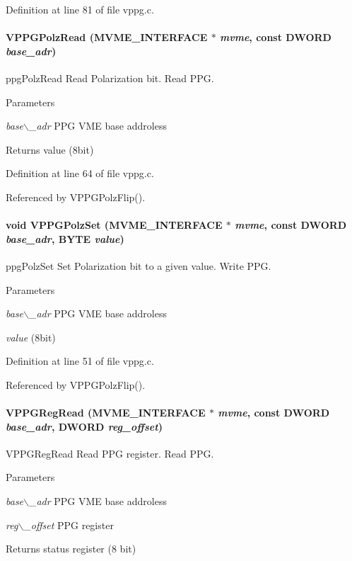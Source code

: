 Definition at line 81 of file vppg.c.
\paragraph[{VPPGPolzRead}]{ VPPGPolzRead ({\bf MVME\_\-INTERFACE} $\ast$ {\em mvme}, \/  const {\bf DWORD} {\em base\_\-adr})}\hfill\label{vppg_8c_a5250200ded85e3f2e65c941384379ed5}
ppgPolzRead Read Polarization bit.  Read PPG. 
\begin{DoxyParams}{Parameters}
\item[{\em base$\backslash$\_\-adr}]PPG VME base addroless \end{DoxyParams}
\begin{DoxyReturn}{Returns}
value (8bit) 
\end{DoxyReturn}


Definition at line 64 of file vppg.c.

Referenced by VPPGPolzFlip().
\paragraph[{VPPGPolzSet}]{\setlength{\rightskip}{0pt plus 5cm}void VPPGPolzSet ({\bf MVME\_\-INTERFACE} $\ast$ {\em mvme}, \/  const {\bf DWORD} {\em base\_\-adr}, \/  {\bf BYTE} {\em value})}\hfill\label{vppg_8c_aba92a718f41a4d59f7ee3493fc703c42}
ppgPolzSet Set Polarization bit to a given value.  Write PPG. 
\begin{DoxyParams}{Parameters}
\item[{\em base$\backslash$\_\-adr}]PPG VME base addroless \item[{\em value}](8bit) \end{DoxyParams}


Definition at line 51 of file vppg.c.

Referenced by VPPGPolzFlip().
\paragraph[{VPPGRegRead}]{ VPPGRegRead ({\bf MVME\_\-INTERFACE} $\ast$ {\em mvme}, \/  const {\bf DWORD} {\em base\_\-adr}, \/  {\bf DWORD} {\em reg\_\-offset})}\hfill\label{vppg_8c_ab31234aa03b2821e9b5fc3be5a62d2fb}
VPPGRegRead Read PPG register.  Read PPG. 
\begin{DoxyParams}{Parameters}
\item[{\em base$\backslash$\_\-adr}]PPG VME base addroless \item[{\em reg$\backslash$\_\-offset}]PPG register \end{DoxyParams}
\begin{DoxyReturn}{Returns}
status register (8 bit) 
\end{DoxyReturn}


